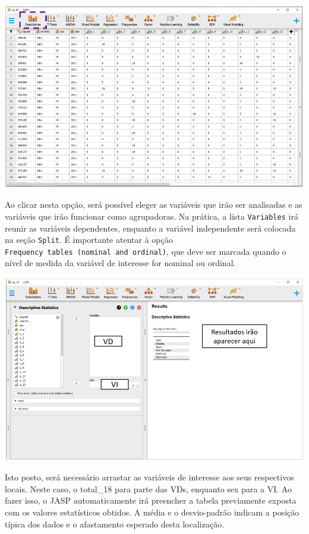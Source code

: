 \documentclass[
]{book}
\begin{document}
\includegraphics{./img/jasp_descriptives.png}

Ao clicar nesta opção, será possível eleger as variáveis que irão ser
analisadas e as variáveis que irão funcionar como agrupadoras. Na
prática, a lista \texttt{Variables} irá reunir as variáveis dependentes,
enquanto a variável independente será colocada na seção \texttt{Split}.
É importante atentar à opção
\texttt{Frequency\ tables\ (nominal\ and\ ordinal)}, que deve ser
marcada quando o nível de medida da variável de interesse for nominal ou
ordinal.

\includegraphics{./img/jasp_descriptives2.png}

Isto posto, será necessário arrastar as variáveis de interesse aos seus
respectivos locais. Neste caso, o total\_18 para parte das VDs, enquanto
sex para a VI. Ao fazer isso, o JASP automaticamente irá preencher a
tabela previamente exposta com os valores estatísticos obtidos. A média
e o desvio-padrão indicam a posição típica dos dados e o afastamento
esperado desta localização.
\end{document}
